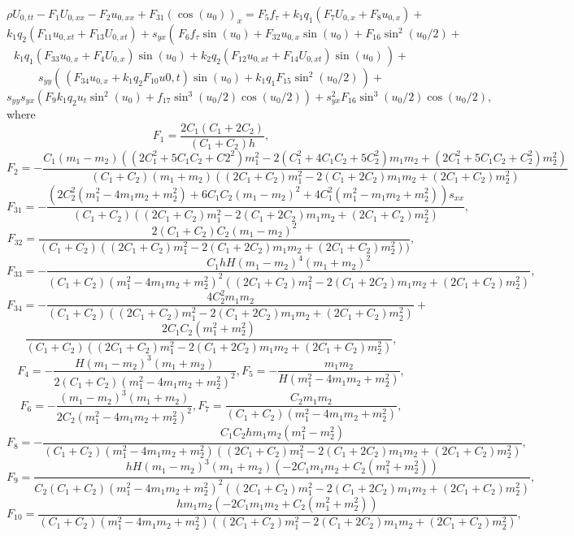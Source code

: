 \[
\rho U_{0,tt}-F_1 U_{0,xx}-F_2 u_{0,xx}+F_{31} ( \cos(u_0))_x= F_5 f_\tau+k_1 q_1 (F_7 U_{0,x}+F_8 u_{0,x})+
\]
\[
k_1 q_2 (F_{11} u_{0,xt}+ F_{13} U_{0,xt})+s_{yx}\left(\frac{}{} F_6 f_\tau \sin (u_0)+F_{32} u_{0,x} \sin (u_0)+F_{16} \sin^2(u_0/2)+\right.
\]
\[
\left. k_1 q_1 (F_{33} u_{0,x}+F_4 U_{0,x})\sin(u_0)+k_2 q_2(F_{12} u_{0,xt}+F_{14} U_{0,xt})\sin(u_0) \frac{}{}\right)+
\]
\[
s_{yy}\left(\frac{}{} (F_{34} u_{0,x}+ k_1 q_2 F_{10} u{0,t})\sin(u_0)+k_1 q_1 F_{15}\sin^2(u_0/2)\frac{}{}\right)+
\]
\begin{equation}
	s_{yy} s_{yx} (F_9 k_1 q_2 u_t \sin^2(u_0)+f_{17} \sin^3(u_0/2)\cos(u_0/2))+s_{yx}^2 F_{16}  \sin^3(u_0/2)\cos(u_0/2) , \label{goveq1}
\end{equation}
where
\[
F_1=\frac{2 C_1 (C_1 + 2 C_2)}{(C_1 + C_2) h},
\]
\[
F_2=-\frac{C_1 (m_1 - m_2) ((2 C_1^2 + 5 C_1 C_2 + C2^2) m_1^2 - 
	2 (C_1^2 + 4 C_1 C_2 + 5 C_2^2) m_1 m_2 + (2 C_1^2 + 5 C_1 C_2 + 
	C_2^2) m_2^2)}{(C_1 + C_2) (m_1 + m_2) ((2 C_1 + C_2) m_1^2 - 
	2 (C_1 + 2 C_2) m_1 m_2 + (2 C_1 + C_2) m_2^2)}
\]
\[
F_{31}=-\frac{(2 C_2^2 (m_1^2-4m_1 m_2+ m_2^2)+ 6 C_1 C_2 (m_1 - m_2)^2+   4 C_1^2 (m_1^2 - m_1 m_2 + m_2^2))s_{xx}
}{(C_1 + C_2) ((2 C_1 + C_2) m_1^2 -  2 (C_1 + 2 C_2) m_1 m_2 + (2 C_1 + C_2) m_2^2)} , 
\]
\[
F_{32}=\frac{ 2( C_1+C_2) C_2 (m_1 - m_2)^2
}{(C_1 + C_2) ((2 C_1 + C_2) m_1^2 - 
	2 (C_1 + 2 C_2) m_1 m_2 + (2 C_1 + C_2) m_2^2))},
\]
\[
F_{33}=-\frac{C_1 h H  (m_1 - m_2)^4 (m_1 + m_2)^2}{(C_1 + C_2) (m_1^2 - 
	4 m_1 m_2 + m_2^2)^2 ((2 C_1 + C_2) m_1^2 - 
	2 (C_1 + 2 C_2) m_1 m_2 + (2 C_1 + C_2) m_2^2)},
\]
\[
F_{34}=-\frac{4 C_2^2 m_1 m_2}{(C_1 + C_2) ((2 C_1 + C_2) m_1^2 - 
	2 (C_1 + 2 C_2) m_1 m_2 + (2 C_1 + C_2) m_2^2)} +
\]
\[\frac{
	2 C_1 C_2 (m_1^2 + m_2^2)}{(C_1 + C_2) ((2 C_1 + C_2) m_1^2 - 
	2 (C_1 + 2 C_2) m_1 m_2 + (2 C_1 + C_2) m_2^2)},
\]
\[
F_4=-\frac{H  (m_1 - m_2)^3 (m_1 + m_2)}{2(C_1 + C_2) (m_1^2 - 4 m_1 m_2 + 
	m_2^2)^2},
F_5=-\frac{m_1 m_2}{H (m_1^2 - 4 m_1 m_2 + m_2^2)},
\]
\[
F_6=-\frac{(m_1 - m_2)^3 (m_1 + m_2) }{2 C_2 (m_1^2 - 4 m_1 m_2 + m_2^2)^2},
F_7=\frac{C_2  m_1 m_2 }{(C_1 + C_2) (m_1^2 - 4 m_1 m_2 + m_2^2)},
\]
\[
F_8=-\frac{C_1 C_2 h  m_1 m_2 (m_1^2 - m_2^2)}{(C_1 + C_2) (m_1^2 - 4 m_1 m_2 +
	m_2^2) ((2 C_1 + C_2) m_1^2 - 2 (C_1 + 2 C_2) m_1 m_2 + (2 C_1 + C_2) m_2^2)},
\]
\[
F_9=\frac{h H  (m_1 - m_2)^3 (m_1 + m_2) (-2 C_1 m_1 m_2 + 
	C_2 (m_1^2 + m_2^2))}{C_2 (C_1 + C_2) (m_1^2 - 4 m_1 m_2 + 
	m_2^2)^2 ((2 C_1 + C_2) m_1^2 - 2 (C_1 + 2 C_2) m_1 m_2 + (2 C_1 + C_2) m_2^2)
},
\]
\[
F_{10}=\frac{h  m_1 m_2 (-2 C_1 m_1 m_2 + C_2 (m_1^2 + m_2^2))}{(C_1 + 
	C_2) (m_1^2 - 4 m_1 m_2 + m_2^2) ((2 C_1 + C_2) m_1^2 - 
	2 (C_1 + 2 C_2) m_1 m_2 + (2 C_1 + C_2) m_2^2)},
\]
